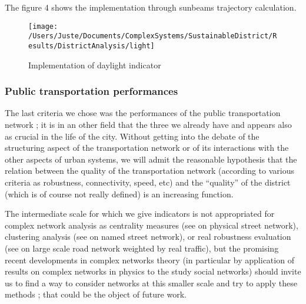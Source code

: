 \documentclass[english]{article}
\begin{document}
\bigskip{}


The figure 4 shows the implementation through sunbeams trajectory
calculation.

\begin{figure}
\hfill{}\texttt{[image: /Users/Juste/Documents/ComplexSystems/SustainableDistrict/Results/DistrictAnalysis/light]}\hfill{}\hfill{}\caption{Implementation of daylight indicator}


\end{figure}



\subsubsection{Public transportation performances}

The last criteria we chose was the performances of the public transportation
network ; it is in an other field that the three we already have and
appears also as crucial in the life of the city. Without getting into
the debate of the structuring aspect of the transportation network
or of its interactions with the other aspects of urban systems, we
will admit the reasonable hypothesis that the relation between the
quality of the transportation network (according to various criteria
as robustness, connectivity, speed, etc) and the ``quality'' of
the district (which is of course not really defined) is an increasing
function.

\bigskip{}


The intermediate scale for which we give indicators is not appropriated
for complex network analysis as centrality measures (see \cite{crucitti2006centrality}
on physical street network), clustering analysis (see \cite{jiang2004topological}
on named street network), or real robustness evaluation (see \cite{RePEc:eee:transa:v:44:y:2010:i:5:p:323-336}
on large scale road network weighted by real traffic), but the promising
recent developments in complex networks theory (in particular by application
of results on complex networks in physics to the study social networks)
should invite us to find a way to consider networks at this smaller
scale and try to apply these methods ; that could be the object of
future work.

\bigskip{}
\end{document}
